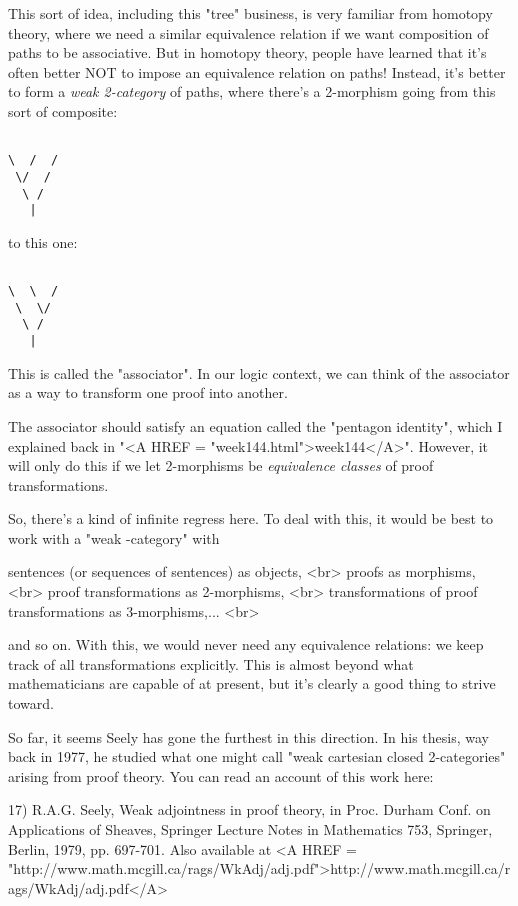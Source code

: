 This sort of idea, including this "tree" business, is very familiar 
from homotopy theory, where we need a similar equivalence relation if we
want composition of paths to be associative.  But in homotopy theory, 
people have learned that it's often better NOT to impose an equivalence 
relation on paths!  Instead, it's better to form a \emph{weak 2-category} 
of paths, where there's a 2-morphism going from this sort of composite:


\begin{verbatim}

\  /  /
 \/  /
  \ /
   |
\end{verbatim}
    
to this one:


\begin{verbatim}

\  \  /
 \  \/
  \ /
   |
\end{verbatim}
    

This is called the "associator".  In our logic context, we can 
think of 
the associator as a way to transform one proof into another.  

The associator should satisfy an equation called 
the "pentagon identity",
which I explained back in "<A HREF = "week144.html">week144</A>".  
However, it will only do this if
we let 2-morphisms be \emph{equivalence classes} of proof transformations.

So, there's a kind of infinite regress here.  To deal with this, it
would be best to work with a "weak \omega -category" with

sentences (or sequences of sentences) as objects, <br>
proofs as morphisms, <br>
proof transformations as 2-morphisms, <br>
transformations of proof transformations as 3-morphisms,... <br>

and so on.   With this, we would never need any equivalence relations:
we keep track of all transformations explicitly.  This is almost beyond 
what mathematicians are capable of at present, but it's clearly a good 
thing to strive toward.

So far, it seems Seely has gone the furthest in this direction.
In his thesis, way back in 1977, he studied what one might call "weak 
cartesian closed 2-categories" arising from proof theory.  You can read 
an account of this work here:

17) R.A.G. Seely, Weak adjointness in proof theory, in Proc. Durham Conf. 
on Applications of Sheaves, Springer Lecture Notes in Mathematics 753, 
Springer, Berlin, 1979, pp. 697-701.  Also available at
<A HREF = "http://www.math.mcgill.ca/rags/WkAdj/adj.pdf">http://www.math.mcgill.ca/rags/WkAdj/adj.pdf</A>

